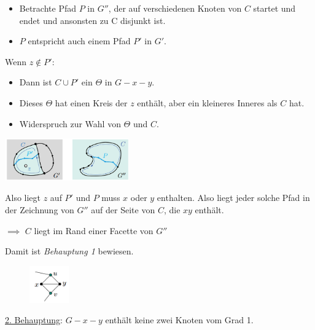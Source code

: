 \begin{itemize}
	\item Betrachte Pfad $P$ in $G''$, der auf verschiedenen Knoten von $C$ startet und endet und ansonsten zu C disjunkt ist.
	\item $P$ entspricht auch einem Pfad $P'$ in $G'$.
\end{itemize}

Wenn $z\notin P'$:
\begin{itemize}
	\item Dann ist $C\cup P'$ ein $\Theta$ in $G-x-y$.
	\item Dieses $\Theta$ hat einen Kreis der $z$ enthält, aber ein kleineres Inneres als $C$ hat.
	\item Widerspruch zur Wahl von $\Theta$ und $C$.
\end{itemize}
\begin{center}
	\includegraphics[width=0.4\textwidth]{images/wagner-5.png}
\end{center}

Also liegt $z$ auf $P'$ und $P$ muss $x$ oder $y$ enthalten. Also liegt jeder solche Pfad in der Zeichnung von $G''$ auf der Seite von $C$, die $xy$ enthält. 


$\implies$ $C$ liegt im Rand einer Facette von $G''$

Damit ist \textit{Behauptung 1} bewiesen.\\

\begin{figure}
	\centering
	\vspace{-30pt}
	\includegraphics[width=0.15\textwidth]{images/wagner-7.png}
	\vspace{40pt}
	\vspace{-1000pt}
\end{figure}
\underline{2. Behauptung}: $G-x-y$ enthält keine zwei Knoten vom Grad 1.

